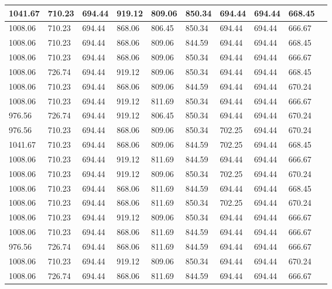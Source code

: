 \begin{longtable}{|l|l|l|l|l|l|l|l|l|l|}
		1041.67  & 710.23  & 694.44  & 919.12   & 809.06 & 850.34   & 694.44  & 694.44  & 668.45  \\ \hline
		1008.06  & 710.23  & 694.44  & 868.06   & 806.45 & 850.34   & 694.44  & 694.44  & 666.67  \\ \hline
		1008.06  & 710.23  & 694.44  & 868.06   & 809.06 & 844.59   & 694.44  & 694.44  & 668.45  \\ \hline
		1008.06  & 710.23  & 694.44  & 868.06   & 809.06 & 850.34   & 694.44  & 694.44  & 666.67  \\ \hline
		1008.06  & 726.74  & 694.44  & 919.12   & 809.06 & 850.34   & 694.44  & 694.44  & 668.45  \\ \hline
		1008.06  & 710.23  & 694.44  & 868.06   & 809.06 & 844.59   & 694.44  & 694.44  & 670.24  \\ \hline
		1008.06  & 710.23  & 694.44  & 919.12   & 811.69 & 850.34   & 694.44  & 694.44  & 666.67  \\ \hline
		976.56   & 726.74  & 694.44  & 919.12   & 806.45 & 850.34   & 694.44  & 694.44  & 670.24  \\ \hline
		976.56   & 710.23  & 694.44  & 868.06   & 809.06 & 850.34   & 702.25  & 694.44  & 670.24  \\ \hline
		1041.67  & 710.23  & 694.44  & 868.06   & 809.06 & 844.59   & 702.25  & 694.44  & 668.45  \\ \hline
		1008.06  & 710.23  & 694.44  & 919.12   & 811.69 & 844.59   & 694.44  & 694.44  & 666.67  \\ \hline
		1008.06  & 710.23  & 694.44  & 919.12   & 809.06 & 850.34   & 702.25  & 694.44  & 670.24  \\ \hline
		1008.06  & 710.23  & 694.44  & 868.06   & 811.69 & 844.59   & 694.44  & 694.44  & 668.45  \\ \hline
		1008.06  & 710.23  & 694.44  & 868.06   & 811.69 & 850.34   & 702.25  & 694.44  & 670.24  \\ \hline
		1008.06  & 710.23  & 694.44  & 919.12   & 809.06 & 850.34   & 694.44  & 694.44  & 666.67  \\ \hline
		1008.06  & 710.23  & 694.44  & 868.06   & 811.69 & 844.59   & 694.44  & 694.44  & 666.67  \\ \hline
		976.56   & 726.74  & 694.44  & 868.06   & 811.69 & 844.59   & 694.44  & 694.44  & 666.67  \\ \hline
		1008.06  & 710.23  & 694.44  & 919.12   & 809.06 & 850.34   & 694.44  & 694.44  & 670.24  \\ \hline
		1008.06  & 726.74  & 694.44  & 868.06   & 811.69 & 844.59   & 694.44  & 694.44  & 666.67  \\ \hline

\end{longtable}
